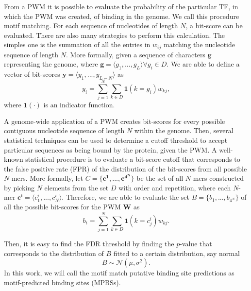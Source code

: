 From a PWM it is possible to evaluate the probability of the particular TF, in which the PWM was created, of binding in the genome. We call this procedure motif matching. For each sequence of nucleotides of length $ N $, a bit-score can be evaluated. There are also many strategies to perform this calculation. The simples one is the summation of all the entries in $ w_{ij} $ matching the nucleotide sequence of length $ N $. More formally, given a sequence of characters $\mathbf{g}$ representing the genome, where $\mathbf{g} = \langle{g}_{1}, ..., {g}_{L}\rangle \forall {g}_{i} \in D$. We are able to define a vector of bit-scores $\mathbf{y} = \langle{y}_{1}, ..., {y}_{L-N}\rangle$ as
\begin{equation}
  \label{eq:motif.match}
  {y}_{i} = \sum_{j=1}^{N} \sum_{k \in D} {\mathbf{1}}(k={g}_{i}){w}_{kj},
\end{equation}
where ${\mathbf{1}}(\cdot)$ is an indicator function. 

A genome-wide application of a PWM creates bit-scores for every possible contiguous nucleotide sequence of length $ N $ within the genome. Then, several statistical techniques can be used to determine a cutoff threshold to accept particular sequences as being bound by the protein, given the PWM. A well-known statistical procedure is to evaluate a bit-score cutoff that corresponds to the false positive rate (FPR) of the distribution of the bit-scores from all possible $N$-mers. More formally, let $C = \{\mathbf{{c}^{1}}, ..., \mathbf{{c}^{4^N}}\}$ be the set of all $N$-mers constructed by picking $ N $ elements from the set $ D $ with order and repetition, where each $N$-mer $\mathbf{{c}^{i}} = \langle{c}^{i}_{1}, ..., {c}^{i}_{N}\rangle$. Therefore, we are able to evaluate the set $ B = \{ {b}_{1}, ..., {b}_{4^N} \} $ of all the possible bit-scores for the PWM $\mathbf{W}$ as
\begin{equation}
  \label{eq:pwm.cutoff1}
  {b}_{i} = \sum_{j=1}^{N} \sum_{k \in D} {\mathbf{1}}(k={c}^{i}_{j}){w}_{kj}.
\end{equation}

Then, it is easy to find the FDR threshold by finding the $p$-value that corresponds to the distribution of $ B $ fitted to a certain distribution, say normal
\begin{equation}
  \label{eq:pwm.cutoff2}
  B \sim \mathcal{N}({\mu},{\sigma}^{2}).
\end{equation}
In this work, we will call the motif match putative binding site predictions as motif-predicted binding sites (MPBSs).

